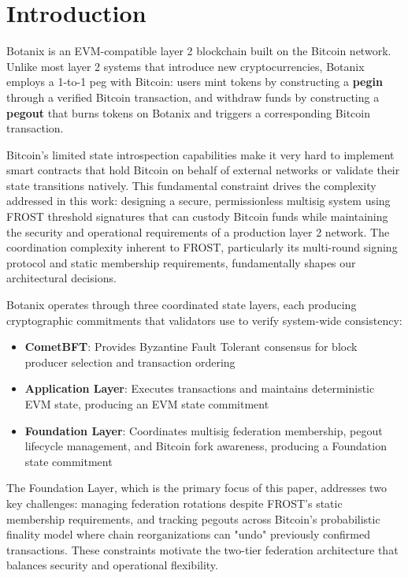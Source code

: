 \section{Introduction}
\label{sec:introduction}

Botanix is an EVM-compatible layer 2 blockchain built on the Bitcoin network. Unlike most layer 2 systems that introduce new cryptocurrencies, Botanix employs a 1-to-1 peg with Bitcoin: users mint tokens by constructing a \textbf{pegin} through a verified Bitcoin transaction, and withdraw funds by constructing a \textbf{pegout} that burns tokens on Botanix and triggers a corresponding Bitcoin transaction.

Bitcoin's limited state introspection capabilities make it very hard to implement smart contracts that hold Bitcoin on behalf of external networks or validate their state transitions natively. This fundamental constraint drives the complexity addressed in this work: designing a secure, permissionless multisig system using FROST threshold signatures that can custody Bitcoin funds while maintaining the security and operational requirements of a production layer 2 network. The coordination complexity inherent to FROST, particularly its multi-round signing protocol and static membership requirements, fundamentally shapes our architectural decisions.

Botanix operates through three coordinated state layers, each producing cryptographic commitments that validators use to verify system-wide consistency:

\begin{itemize}
    \item \textbf{CometBFT}: Provides Byzantine Fault Tolerant consensus for block producer selection and transaction ordering
    \item \textbf{Application Layer}: Executes transactions and maintains deterministic EVM state, producing an EVM state commitment
    \item \textbf{Foundation Layer}: Coordinates multisig federation membership, pegout lifecycle management, and Bitcoin fork awareness, producing a Foundation state commitment
\end{itemize}

The Foundation Layer, which is the primary focus of this paper, addresses two key challenges: managing federation rotations despite FROST's static membership requirements, and tracking pegouts across Bitcoin's probabilistic finality model where chain reorganizations can "undo" previously confirmed transactions. These constraints motivate the two-tier federation architecture that balances security and operational flexibility.

